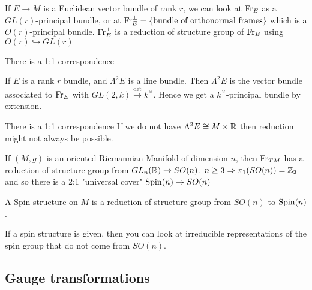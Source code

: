 \documentclass{article}
\begin{document}
\begin{example}
If $E \to M$ is a Euclidean vector bundle of rank $r$, we can look at $\operatorname{Fr}_E$ as a $GL(r)$-principal bundle, or at $\operatorname{Fr}_E^\perp= \left\{ \text{bundle of orthonormal frames} \right\}$ which is a $O(r)$-principal bundle. $\operatorname{Fr}_E^\perp$ is a reduction of structure group of $\operatorname{Fr}_E$ using $O(r) \hookrightarrow GL(r)$
\end{example}


\begin{prop}
There is a 1:1 correspondence 
\end{prop}

\begin{example}
If $E$ is a rank $r$ bundle, and $\Lambda^2 E$ is a line bundle. Then $\Lambda^2 E$ is the vector bundle associated to $\operatorname{Fr}_E$ with $GL(2,k) \overset{\det}{\to} k^\times$. Hence we get a $k^\times$-principal bundle by extension. 
\end{example}

\begin{example}
There is a 1:1 correspondence 
If we do not have $\Lambda^2 E \cong M \times \mathbb{R}$ then reduction might not always be possible. 
\end{example}


\begin{example}
If $(M,g)$ is an oriented Riemannian Manifold of dimension $n$, then $\operatorname{Fr}_{TM}$ has a reduction of structure group from $GL_n(\mathbb{R}) \to SO(n)$. $ n \geq 3 \Rightarrow \pi_1(SO(n)) = \mathbb{Z}_2$ and so there is a 2:1 "universal cover" $\operatorname{Spin}(n) \to SO(n)$
\end{example}

\begin{definition}
A Spin structure on $M$ is a reduction of structure group from $SO(n)$ to $\operatorname{Spin}(n)$. 
\end{definition}

If a spin structure is given, then you can look at irreducible representations of the spin group that do not come from $SO(n)$. 


\subsection{Gauge transformations}
\end{document}

